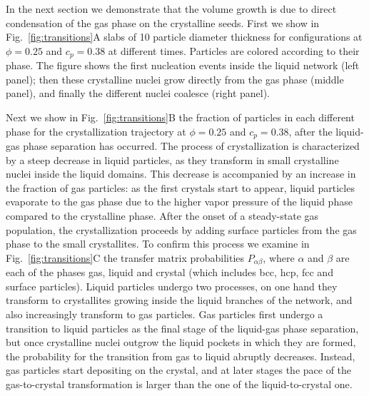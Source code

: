 \documentclass[12pt]{article}
\begin{document}
In the next section we demonstrate that the volume growth is due to direct condensation of the gas phase on the crystalline seeds.
First we show in Fig.~\ref{fig:transitions}A slabs of 10 particle diameter thickness for configurations at $\phi=0.25$ and $c_p=0.38$ at different times.
Particles are colored according to their phase. The figure shows the first nucleation
events inside the liquid network (left panel); then these crystalline nuclei grow directly from the gas phase (middle panel), and finally
the different nuclei coalesce (right panel). 


Next we show in Fig.~\ref{fig:transitions}B the fraction of particles in each different phase for the crystallization trajectory at
$\phi=0.25$ and $c_p=0.38$, after the liquid-gas phase separation has occurred. The process of crystallization is characterized
by a steep decrease in liquid particles, as they transform in small crystalline nuclei inside the liquid domains. This decrease
is accompanied by an increase in the fraction of gas particles: as the first crystals start to appear, liquid particles evaporate
to the gas phase due to the higher vapor pressure of the liquid phase compared to the crystalline phase. After the onset
of a steady-state gas population, the crystallization proceeds by adding surface particles from the gas phase to the small crystallites. To confirm this process we
examine in Fig.~\ref{fig:transitions}C the transfer matrix probabilities $P_{\alpha\beta}$, where $\alpha$ and $\beta$ are each of the
phases gas, liquid and crystal (which includes bcc, hcp, fcc and surface particles). Liquid particles undergo two processes, on one
hand they transform to crystallites growing inside the liquid branches of the network, and also increasingly transform to gas particles.
Gas particles first undergo a transition to liquid particles as the final stage of the liquid-gas phase separation, but once
crystalline nuclei outgrow the liquid pockets in which they are formed, the probability for the transition from gas to liquid
abruptly decreases. Instead, gas particles start depositing on the crystal, and at later stages the pace of the gas-to-crystal transformation
is larger than the one of the liquid-to-crystal one.
\end{document}
